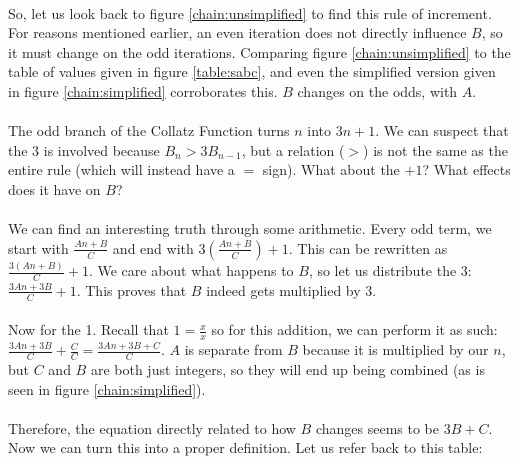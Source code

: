 \documentclass[12pt,letterpaper]{article}
\begin{document}
			\paragraph{} So, let us look back to figure \ref{chain:unsimplified} to find this rule of increment. For reasons mentioned earlier, an even iteration does not directly influence $B$, so it must change on the odd iterations. Comparing figure \ref{chain:unsimplified} to the table of values given in figure \ref{table:sabc}, and even the simplified version given in figure \ref{chain:simplified} corroborates this. $B$ changes on the odds, with $A$.
			
			\paragraph{} The odd branch of the Collatz Function turns $n$ into $3n+1$. We can suspect that the $3$ is involved because $B_n > 3B_{n-1}$, but a relation ($>$) is not the same as the entire rule (which will instead have a $=$ sign). What about the $+1$? What effects does it have on $B$?
			
			\paragraph{} We can find an interesting truth through some arithmetic. Every odd term, we start with $\frac{An + B}{C}$ and end with $3\left(\frac{An + B}{C}\right) + 1$. This can be rewritten as $\frac{3(An + B)}{C} + 1$. We care about what happens to $B$, so let us distribute the 3: $\frac{3An + 3B}{C} + 1$. This proves that $B$ indeed gets multiplied by 3. 
			
			\paragraph{} Now for the 1. Recall that $1 = \frac{x}{x}$ so for this addition, we can perform it as such: $\frac{3An + 3B}{C} + \frac{C}{C} = \frac{3An + 3B + C}{C}$. $A$ is separate from $B$ because it is multiplied by our $n$, but $C$ and $B$ are both just integers, so they will end up being combined (as is seen in figure \ref{chain:simplified}).
			
			\paragraph{} Therefore, the equation directly related to how $B$ changes seems to be $3B + C$. Now we can turn this into a proper definition. Let us refer back to this table:
			
\end{document}
